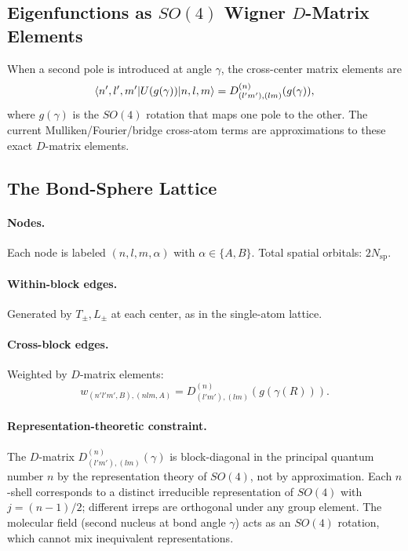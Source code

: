 \documentclass[aps,pra,twocolumn,superscriptaddress,longbibliography]{revtex4-2}
\begin{document}
\subsection{Eigenfunctions as $SO(4)$ Wigner $D$-Matrix Elements}

When a second pole is introduced at angle $\gamma$, the cross-center
matrix elements are
\begin{equation}
\braket{n', l', m' | U(g(\gamma)) | n, l, m}
= D^{(n)}_{(l'm'),(lm)}(g(\gamma)),
\label{eq:D_matrix}
\end{equation}
where $g(\gamma)$ is the $SO(4)$ rotation that maps one pole to the
other.  The current Mulliken/Fourier/bridge cross-atom terms are
approximations to these exact $D$-matrix elements.

\subsection{The Bond-Sphere Lattice}

\paragraph{Nodes.}  Each node is labeled $(n, l, m, \alpha)$ with
$\alpha \in \{A, B\}$.  Total spatial orbitals: $2N_{\text{sp}}$.

\paragraph{Within-block edges.}  Generated by $T_\pm, L_\pm$ at each
center, as in the single-atom lattice.

\paragraph{Cross-block edges.}  Weighted by $D$-matrix elements:
\begin{equation}
w_{(n'l'm',B),(nlm,A)} = D^{(n)}_{(l'm'),(lm)}(g(\gamma(R))).
\label{eq:cross_weight}
\end{equation}

\paragraph{Representation-theoretic constraint.}
The $D$-matrix $D^{(n)}_{(l'm'),(lm)}(\gamma)$ is block-diagonal in the
principal quantum number $n$ by the representation theory of $SO(4)$,
not by approximation.  Each $n$-shell corresponds to a distinct irreducible
representation of $SO(4)$ with $j = (n-1)/2$; different irreps are
orthogonal under any group element.  The molecular field (second nucleus at
bond angle $\gamma$) acts as an $SO(4)$ rotation, which cannot mix
inequivalent representations.
\end{document}
